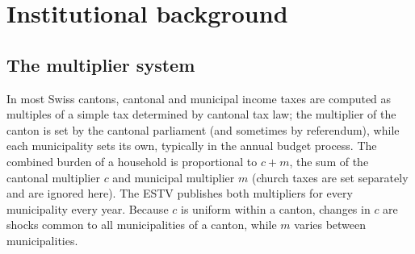 \documentclass[11pt,a4paper]{article}
\begin{document}
\section{Institutional background}\label{sec:inst}

\subsection{The multiplier system}
In most Swiss cantons, cantonal and municipal income taxes are computed as multiples of a simple tax determined by cantonal tax law; the multiplier of the canton is set by the cantonal parliament (and sometimes by referendum), while each municipality sets its own, typically in the annual budget process. The combined burden of a household is proportional to $c+m$, the sum of the cantonal multiplier $c$ and municipal multiplier $m$ (church taxes are set separately and are ignored here). The ESTV publishes both multipliers for every municipality every year. Because $c$ is uniform within a canton, changes in $c$ are shocks common to all municipalities of a canton, while $m$ varies between municipalities.
\end{document}
